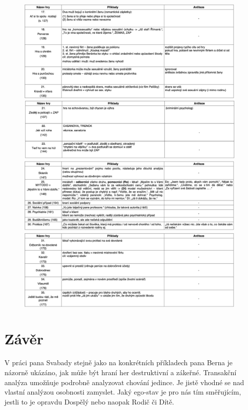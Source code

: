     \begin{figure}
        \centering
        \includegraphics[width=\textwidth]{pictures/6.png}
        \includegraphics[width=\textwidth]{pictures/7.png}
        \includegraphics[width=\textwidth]{pictures/8.png}
        \includegraphics[width=\textwidth]{pictures/9.png}
    \end{figure}{}
\chapter{Závěr}

V práci pana Svabady stejně jako na konkrétních příkladech pana Berna je názorně ukázáno, jak může být hraní her destruktivní a zákeřné. Transakční analýza umožňuje podrobně analyzovat chování jedince. Je jistě vhodné se nad vlastní analýzou osobnosti zamyslet. Jaký ego-stav je pro nás tím směřujícím, jestli to je opravdu Dospělý nebo naopak Rodič či Dítě. \\

